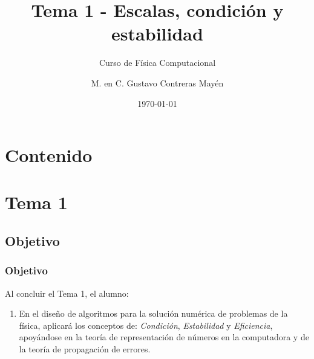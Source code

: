 
% 
% 
% 
% 
\title{\large{Tema 1 - Escalas, condición y estabilidad}}
\subtitle{Curso de Física Computacional}
\author[]{M. en C. Gustavo Contreras Mayén}
\date{\today}

\maketitle
\section*{Contenido}
\fontsize{14}{14}\selectfont
{}
\section{Tema 1}
\subsection{Objetivo}
\begin{frame}
\frametitle{Objetivo}
Al concluir el Tema 1, el alumno:
\begin{enumerate}
\item En el diseño de algoritmos para la solución numérica de problemas de la física, aplicará los conceptos de: \textit{Condición}, \textit{Estabilidad} y \textit{Eficiencia}, apoyándose en la teoría de representación de números en la computadora y de la teoría de propagación de errores.
\end{enumerate}
\end{frame}
